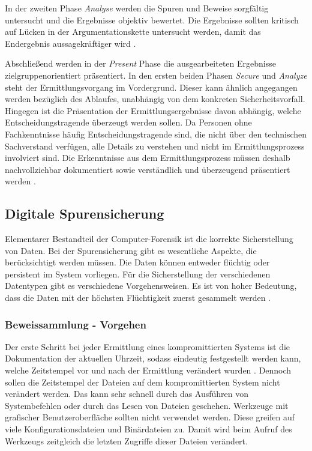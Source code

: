 \documentclass[12pt,DIV=14, version=first, BCOR=10mm,a4paper,twoside,parskip=half-,headsepline,headinclude]{scrartcl}
\begin{document}
    In der zweiten Phase \textit{Analyse} werden die Spuren und Beweise sorgfältig untersucht und die Ergebnisse objektiv bewertet. Die Ergebnisse sollten kritisch auf Lücken in der Argumentationskette untersucht werden, damit das Endergebnis aussagekräftiger wird \cite[vgl. S. 69]{texbook01}.

    Abschließend werden in der \textit{Present} Phase die ausgearbeiteten Ergebnisse zielgruppenorientiert präsentiert. In den ersten beiden Phasen \textit{Secure} und \textit{Analyze} steht der Ermittlungsvorgang im Vordergrund. Dieser kann ähnlich angegangen werden bezüglich des Ablaufes, unabhängig von dem konkreten Sicherheitsvorfall. Hingegen ist die Präsentation der Ermittlungsergebnisse davon abhängig, welche Entscheidungstragende überzeugt werden sollen. Da Personen ohne Fachkenntnisse häufig Entscheidungstragende sind, die nicht über den technischen Sachverstand verfügen, alle Details zu verstehen und nicht im Ermittlungsprozess involviert sind. Die Erkenntnisse aus dem Ermittlungsprozess müssen deshalb nachvollziehbar dokumentiert sowie verständlich und überzeugend präsentiert werden \cite[vgl. S. 69]{texbook01}.
    
	\subsection {Digitale Spurensicherung}\label{DigitaleSpurensicherung}
	Elementarer Bestandteil der Computer-Forensik ist die korrekte Sicherstellung von Daten. Bei der Spurensicherung gibt es wesentliche Aspekte, die berücksichtigt werden müssen. Die Daten können entweder flüchtig oder persistent im System vorliegen. Für die Sicherstellung der verschiedenen Datentypen gibt es verschiedene Vorgehensweisen. Es ist von hoher Bedeutung, dass die Daten mit der höchsten Flüchtigkeit zuerst gesammelt werden \cite[vgl. S. 112]{texbook04}.
	
	    \subsubsection{Beweissammlung - Vorgehen} \label{Zeitstempel}
        Der erste Schritt bei jeder Ermittlung eines kompromittierten Systems ist die Dokumentation der aktuellen Uhrzeit, sodass eindeutig festgestellt werden kann, welche Zeitstempel vor und nach der Ermittlung verändert wurden \cite[vgl. S. 86]{texbook01}. Dennoch sollen die Zeitstempel der Dateien auf dem kompromittierten System nicht verändert werden. Das kann sehr schnell durch das Ausführen von Systembefehlen oder durch das Lesen von Dateien geschehen. Werkzeuge mit grafischer Benutzeroberfläche sollten nicht verwendet werden. Diese greifen auf viele Konfigurationsdateien und Binärdateien zu. Damit wird beim Aufruf des Werkzeugs zeitgleich die letzten Zugriffe dieser Dateien verändert.      
        
\end{document}
